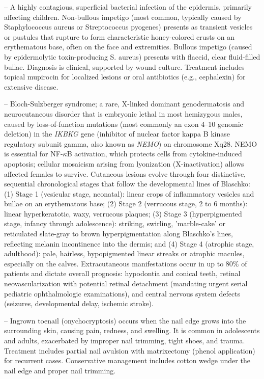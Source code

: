 -- A highly contagious, superficial bacterial infection of the epidermis, primarily affecting children. Non-bullous impetigo (most common, typically caused by Staphylococcus aureus or Streptococcus pyogenes) presents as transient vesicles or pustules that rupture to form characteristic honey-colored crusts on an erythematous base, often on the face and extremities. Bullous impetigo (caused by epidermolytic toxin-producing S. aureus) presents with flaccid, clear fluid-filled bullae. Diagnosis is clinical, supported by wound culture. Treatment includes topical mupirocin for localized lesions or oral antibiotics (e.g., cephalexin) for extensive disease.

-- Bloch-Sulzberger syndrome; a rare, X-linked dominant genodermatosis and neurocutaneous disorder that is embryonic lethal in most hemizygous males, caused by loss-of-function mutations (most commonly an exon 4--10 genomic deletion) in the \textit{IKBKG} gene (inhibitor of nuclear factor kappa B kinase regulatory subunit gamma, also known as \textit{NEMO}) on chromosome Xq28. NEMO is essential for NF-$\kappa$B activation, which protects cells from cytokine-induced apoptosis; cellular mosaicism arising from lyonization (X-inactivation) allows affected females to survive. Cutaneous lesions evolve through four distinctive, sequential chronological stages that follow the developmental lines of Blaschko: (1) Stage 1 (vesicular stage, neonatal): linear crops of inflammatory vesicles and bullae on an erythematous base; (2) Stage 2 (verrucous stage, 2 to 6 months): linear hyperkeratotic, waxy, verrucous plaques; (3) Stage 3 (hyperpigmented stage, infancy through adolescence): striking, swirling, 'marble-cake' or reticulated slate-gray to brown hyperpigmentation along Blaschko's lines, reflecting melanin incontinence into the dermis; and (4) Stage 4 (atrophic stage, adulthood): pale, hairless, hypopigmented linear streaks or atrophic macules, especially on the calves. Extracutaneous manifestations occur in up to $80\%$ of patients and dictate overall prognosis: hypodontia and conical teeth, retinal neovascularization with potential retinal detachment (mandating urgent serial pediatric ophthalmologic examinations), and central nervous system defects (seizures, developmental delay, ischemic stroke).

-- Ingrown toenail (onychocryptosis) occurs when the nail edge grows into the surrounding skin, causing pain, redness, and swelling. It is common in adolescents and adults, exacerbated by improper nail trimming, tight shoes, and trauma. Treatment includes partial nail avulsion with matrixectomy (phenol application) for recurrent cases. Conservative management includes cotton wedge under the nail edge and proper nail trimming.

